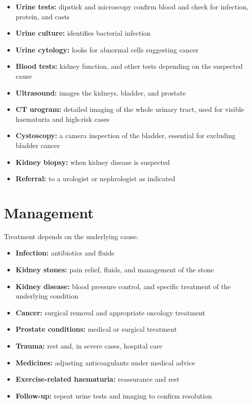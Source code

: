 \begin{itemize}
    \item \textbf{Urine tests:} dipstick and microscopy confirm blood and check for infection, protein, and casts
    \item \textbf{Urine culture:} identifies bacterial infection
    \item \textbf{Urine cytology:} looks for abnormal cells suggesting cancer
    \item \textbf{Blood tests:} kidney function, and other tests depending on the suspected cause
    \item \textbf{Ultrasound:} images the kidneys, bladder, and prostate
    \item \textbf{CT urogram:} detailed imaging of the whole urinary tract, used for visible haematuria and high-risk cases
    \item \textbf{Cystoscopy:} a camera inspection of the bladder, essential for excluding bladder cancer
    \item \textbf{Kidney biopsy:} when kidney disease is suspected
    \item \textbf{Referral:} to a urologist or nephrologist as indicated
\end{itemize}

\section*{Management}
Treatment depends on the underlying cause.

\begin{itemize}
    \item \textbf{Infection:} antibiotics and fluids
    \item \textbf{Kidney stones:} pain relief, fluids, and management of the stone
    \item \textbf{Kidney disease:} blood pressure control, and specific treatment of the underlying condition
    \item \textbf{Cancer:} surgical removal and appropriate oncology treatment
    \item \textbf{Prostate conditions:} medical or surgical treatment
    \item \textbf{Trauma:} rest and, in severe cases, hospital care
    \item \textbf{Medicines:} adjusting anticoagulants under medical advice
    \item \textbf{Exercise-related haematuria:} reassurance and rest
    \item \textbf{Follow-up:} repeat urine tests and imaging to confirm resolution
\end{itemize}

